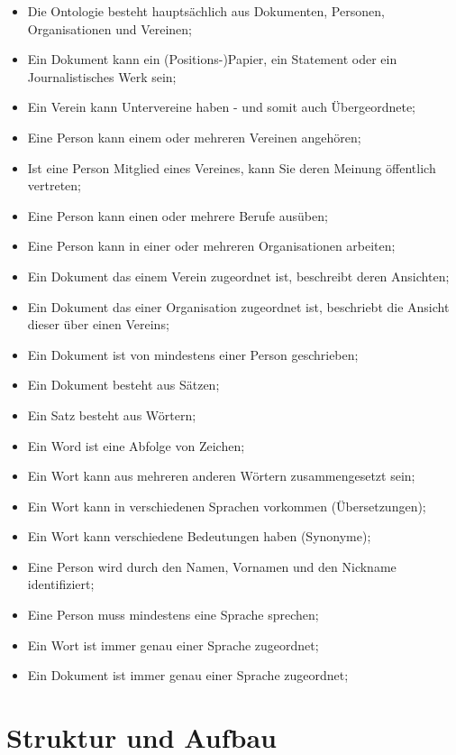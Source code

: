 \documentclass[
    11pt,
    latin1,
    a4paper,
    oneside
]{scrreprt}
\begin{document}
\begin{itemize} \setlength{\itemsep}{0cm}
  \item Die Ontologie besteht haupts\"achlich aus Dokumenten, Personen, Organisationen und Vereinen;
  \item Ein Dokument kann ein (Positions-)Papier, ein Statement oder ein Journalistisches Werk sein;
  \item Ein Verein kann Untervereine haben - und somit auch \"Ubergeordnete;
  \item Eine Person kann einem oder mehreren Vereinen angeh\"oren;
  \item Ist eine Person Mitglied eines Vereines, kann Sie deren Meinung \"offentlich vertreten;
  \item Eine Person kann einen oder mehrere Berufe aus\"uben;
  \item Eine Person kann in einer oder mehreren Organisationen arbeiten;
  \item Ein Dokument das einem Verein zugeordnet ist, beschreibt deren Ansichten;
  \item Ein Dokument das einer Organisation zugeordnet ist, beschriebt die Ansicht dieser \"uber einen Vereins;
  \item Ein Dokument ist von mindestens einer Person geschrieben;
  \item Ein Dokument besteht aus S\"atzen;
  \item Ein Satz besteht aus W\"ortern;
  \item Ein Word ist eine Abfolge von Zeichen;
  \item Ein Wort kann aus mehreren anderen W\"ortern zusammengesetzt sein;
  \item Ein Wort kann in verschiedenen Sprachen vorkommen (\"Ubersetzungen);
  \item Ein Wort kann verschiedene Bedeutungen haben (Synonyme);
  \item Eine Person wird durch den Namen, Vornamen und den Nickname identifiziert;
  \item Eine Person muss mindestens eine Sprache sprechen;
  \item Ein Wort ist immer genau einer Sprache zugeordnet;
  \item Ein Dokument ist immer genau einer Sprache zugeordnet;
\end{itemize}

\section{Struktur und Aufbau} \label{sec:structure}
\end{document}
